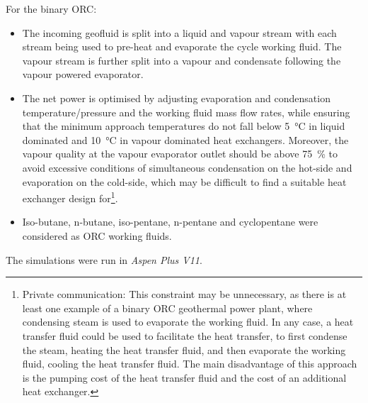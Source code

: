     For the binary \ac{ORC}:
    \begin{itemize}
        \item The incoming geofluid is split into a liquid and vapour stream with each stream being used to pre-heat and evaporate the cycle working fluid. The vapour stream is further split into a vapour and condensate following the vapour powered evaporator.
        \item The net power is optimised by adjusting evaporation and condensation temperature/pressure and the working fluid mass flow rates, while ensuring that the minimum approach temperatures do not fall below \qty{5}{\degreeCelsius} in liquid dominated and \qty{10}{\degreeCelsius} in vapour dominated heat exchangers. Moreover, the vapour quality at the vapour evaporator outlet should be above \qty{75}{\percent} to avoid excessive conditions of simultaneous condensation on the hot-side and evaporation on the cold-side, which may be difficult to find a suitable heat exchanger design for\footnote{Private communication: This constraint may be unnecessary, as there is at least one example of a binary \ac{ORC} geothermal power plant, where condensing steam is used to evaporate the working fluid. In any case, a heat transfer fluid could be used to facilitate the heat transfer, to first condense the steam, heating the heat transfer fluid, and then evaporate the working fluid, cooling the heat transfer fluid. The main disadvantage of this approach is the pumping cost of the heat transfer fluid and the cost of an additional heat exchanger.}.
        \item Iso-butane, n-butane, iso-pentane, n-pentane and cyclopentane were considered as \ac{ORC} working fluids.
    \end{itemize}

    The simulations were run in \emph{Aspen Plus V11}.

